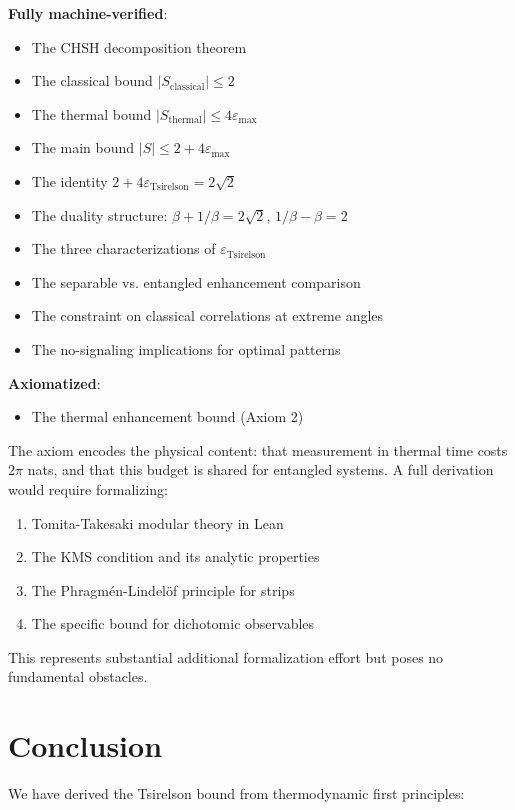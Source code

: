 \documentclass[12pt,a4paper]{article}
\newcommand{\eps}{\varepsilon}
\begin{document}
\textbf{Fully machine-verified}:
\begin{itemize}
\item The CHSH decomposition theorem
\item The classical bound $|S_{\text{classical}}| \leq 2$
\item The thermal bound $|S_{\text{thermal}}| \leq 4\eps_{\max}$
\item The main bound $|S| \leq 2 + 4\eps_{\max}$
\item The identity $2 + 4\eps_{\text{Tsirelson}} = 2\sqrt{2}$
\item The duality structure: $\beta + 1/\beta = 2\sqrt{2}$, $1/\beta - \beta = 2$
\item The three characterizations of $\eps_{\text{Tsirelson}}$
\item The separable vs. entangled enhancement comparison
\item The constraint on classical correlations at extreme angles
\item The no-signaling implications for optimal patterns
\end{itemize}

\textbf{Axiomatized}:
\begin{itemize}
\item The thermal enhancement bound (Axiom 2)
\end{itemize}

The axiom encodes the physical content: that measurement in thermal time costs $2\pi$ nats, and that this budget is shared for entangled systems. A full derivation would require formalizing:
\begin{enumerate}
\item Tomita-Takesaki modular theory in Lean
\item The KMS condition and its analytic properties
\item The Phragmén-Lindelöf principle for strips
\item The specific bound for dichotomic observables
\end{enumerate}

This represents substantial additional formalization effort but poses no fundamental obstacles.

\section{Conclusion}

We have derived the Tsirelson bound from thermodynamic first principles:
\end{document}
